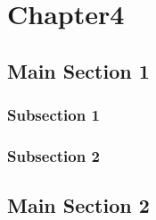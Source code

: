 
\chapter{Chapter4}  %

\label{companion-recovery}


\section{Main Section 1}



\subsection{Subsection 1}



\subsection{Subsection 2}


\section{Main Section 2}
